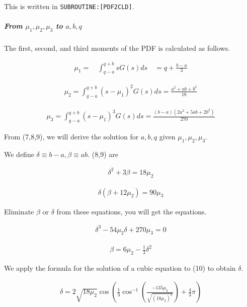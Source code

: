 This is written in \texttt{SUBROUTINE:{[}PDF2CLD{]}}.

\hypertarget{from-mu_1-mu_2-mu_3-to-abq}{%
\subparagraph{\texorpdfstring{From \(\mu_{1}, \mu_{2}, \mu_{3}\) to
\(a,b,q\)}{From \textbackslash mu\_\{1\}, \textbackslash mu\_\{2\}, \textbackslash mu\_\{3\} to a,b,q}}\label{from-mu_1-mu_2-mu_3-to-abq}}

The first, second, and third moments of the PDF is calculated as
follows.

\begin{eqnarray}
\mu_{1}=\quad \int_{q-a}^{q+b}sG(s)ds \quad=q+\frac{b-a}{3}
\label{E08-7}
\end{eqnarray}

\begin{eqnarray}
\mu_{2}=\int_{q-a}^{q+b}\left(s-\mu_{1}\right)^{2} G(s)ds=\frac{a^{2}+a b+b^{2}}{18}
\label{E08-8}
\end{eqnarray}

\begin{eqnarray}
\mu_{3}=\int_{q-a}^{q+b}\left(s-\mu_{1}\right)^{3} G(s)ds=\frac{(b-a)\left(2 a^{2}+5 a b+2 b^{2}\right)}{270}
\label{E08-9}
\end{eqnarray}

From (7,8,9), we will derive the solution for \(a,b , q\) given
\(\mu_{1}, \mu_{2}, \mu_{3}\).

We define \(\delta \equiv b-a, \beta \equiv a b\). (8,9) are

\begin{eqnarray}
\delta^{2}+3 \beta=18 \mu_{2}
\end{eqnarray}

\begin{eqnarray}
\delta\left(\beta+12 \mu_{2}\right)=90 \mu_{3}
\end{eqnarray}

Eliminate \(\beta\) or \(\delta\) from these equations, you will get the
equations.

\begin{eqnarray}
\delta^{3}-54 \mu_{2} \delta+270 \mu_{3}=0
\label{E08-10}
\end{eqnarray}

\begin{eqnarray}
\beta=6 \mu_{2}-\frac{1}{3} \delta^{2}
\label{E08-11}
\end{eqnarray}

We apply the formula for the solution of a cubic equation to (10) to
obtain \(\delta\).

\begin{eqnarray}
\delta=2 \sqrt{18 \mu_{2}} \cos \left(\frac{1}{3} \cos ^{-1}\left(\frac{-135 \mu_{3}}{\sqrt{\left(18 \mu_{2}\right)^{3}}}\right)+\frac{4}{3} \pi\right)
\end{eqnarray}

